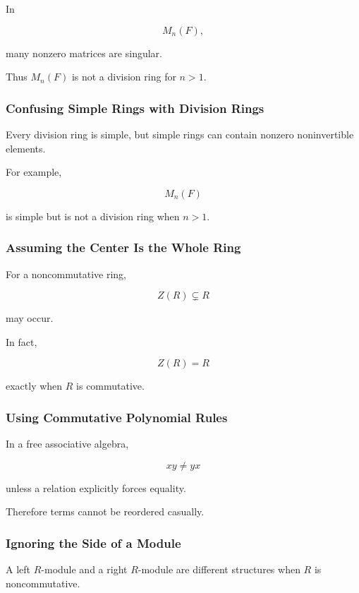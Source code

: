 In

\[ M_n(F), \]

many nonzero matrices are singular.

Thus \(M_n(F)\) is not a division ring for \(n>1\).

\subsubsection{Confusing Simple Rings with Division Rings}

Every division ring is simple, but simple rings can contain nonzero
noninvertible elements.

For example,

\[ M_n(F) \]

is simple but is not a division ring when \(n>1\).

\subsubsection{Assuming the Center Is the Whole Ring}

For a noncommutative ring,

\[ Z(R)\subsetneq R \]

may occur.

In fact,

\[ Z(R)=R \]

exactly when \(R\) is commutative.

\subsubsection{Using Commutative Polynomial Rules}

In a free associative algebra,

\[ xy\neq yx \]

unless a relation explicitly forces equality.

Therefore terms cannot be reordered casually.

\subsubsection{Ignoring the Side of a Module}

A left \(R\)-module and a right \(R\)-module are different structures when
\(R\) is noncommutative.

